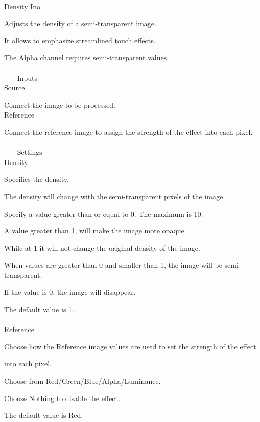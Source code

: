 \documentclass[a4paper,12pt]{article}
\begin{document}
\thispagestyle{empty}

\Large
\noindent \\
Density Ino\medskip
\par
\normalsize
Adjusts the density of a semi-transparent image.\par
It allows to emphasize streamlined touch effects.\par
The Alpha channel requires semi-transparent values.\\
\\
-{-}- \ Inputs \ -{-}-\\
Source\par
Connect the image to be processed.\\
Reference\par
Connect the reference image to assign the strength of the effect into each pixel.\\
\\
-{-}- \ Settings \ -{-}-\\
Density\par
Specifies the density.\par
The density will change with the semi-transparent pixels of the image.\par
Specify a value greater than or equal to 0. The maximum is 10.\par
A value greater than 1, will make the image more opaque.\par
While at 1 it will not change the original density of the image.\par
When values are greater than 0 and smaller than 1, the image will be semi-transparent.\par
If the value is 0, the image will disappear.\par
The default value is 1.\\
\\
Reference\par
Choose how the Reference image values are used to set the strength of the effect\par 
into each pixel.\par
Choose from Red/Green/Blue/Alpha/Luminance.\par
Choose Nothing to disable the effect.\par
The default value is Red.
\end{document}
